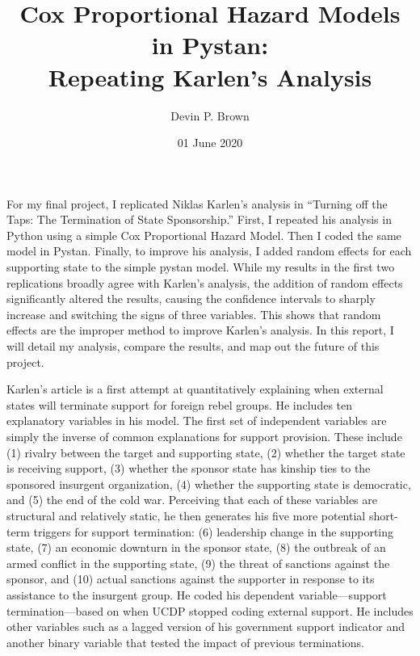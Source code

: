 \documentclass[12pt, a4paper]{article}
\begin{document}
\title{Cox Proportional Hazard Models in Pystan:\\ \large{Repeating Karlen's Analysis}}
\author{Devin P. Brown}
\date{01 June 2020}
\maketitle
For my final project, I replicated Niklas Karlen's analysis in ``Turning off the Taps: The Termination of State Sponsorship.''\autocite{Karlen2019} First, I repeated his analysis in Python using a simple Cox Proportional Hazard Model. Then I coded the same model in Pystan. Finally, to improve his analysis, I added random effects for each supporting state to the simple pystan model. While my results in the first two replications broadly agree with Karlen's analysis, the addition of random effects significantly altered the results, causing the confidence intervals to sharply increase and switching the signs of three variables. This shows that random effects are the improper method to improve Karlen's analysis. In this report, I will detail my analysis, compare the results, and map out the future of this project. 

Karlen's article is a first attempt at quantitatively explaining when external states will terminate support for foreign rebel groups. He includes ten explanatory variables in his model. The first set of independent variables are simply the inverse of common explanations for support provision. These include (1) rivalry between the target and supporting state, (2) whether the target state is receiving support, (3) whether the sponsor state has kinship ties to the sponsored insurgent organization, (4) whether the supporting state is democratic, and (5) the end of the cold war. Perceiving that each of these variables are structural and relatively static, he then generates his five more potential short-term triggers for support termination: (6) leadership change in the supporting state, (7) an economic downturn in the sponsor state, (8) the outbreak of an armed conflict in the supporting state, (9) the threat of sanctions against the sponsor, and (10) actual sanctions against the supporter in response to its assistance to the insurgent group. He coded his dependent variable---support termination---based on when UCDP stopped coding external support. He includes other variables such as a lagged version of his government support indicator and another binary variable that tested the impact of previous terminations.
\end{document}
